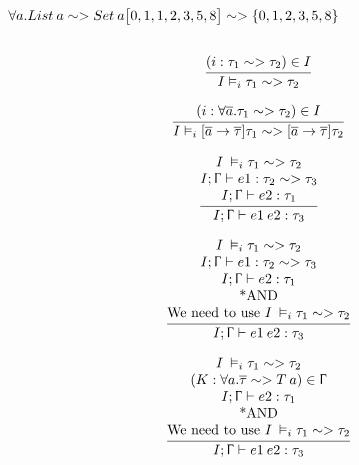 \documentclass{article}
\begin{document}
 
$\forall a. List\:a \sim > Set\:a\\ \\ \\
\big[0,1,1,2,3,5,8\big] \sim > \{0,1,2,3,5,8\}$ \\ \\

\[
  \frac{\begin{array}{@{}c@{}}
   (i: \tau_{1} \sim >\tau_{2}) \in I\\
   
  \end{array}}
  {I \vDash_{i} \tau_{1} \sim > \tau_{2}}
\]

\[
  \frac{\begin{array}{@{}c@{}}
   (i:\forall \overline{a}. \tau_{1} \sim >\tau_{2}) \in I\\
   
  \end{array}}
  {I \vDash_{i} [\overline{a}\rightarrow\overline{\tau}]\tau_{1} \sim > [\overline{a}\rightarrow\overline{\tau}]\tau_{2}}
\]

\[
  \frac{\begin{array}{@{}c@{}}
   I \: \vDash_{i} \tau_{1} \sim > \tau_{2} \\
   I; \Upgamma \vdash e1 : \tau_{2} \sim > \tau_{3}\\
   I; \Upgamma \vdash e2 : \tau_{1}
  \end{array}}
  {I; \Upgamma \vdash e1 \: e2 : \tau_{3}}
\]

\[
  \frac{\begin{array}{@{}c@{}}
   I \: \vDash_{i} \tau_{1} \sim > \tau_{2} \\
   I; \Upgamma \vdash e1 : \tau_{2} \sim > \tau_{3}\\
   I; \Upgamma \vdash e2 : \tau_{1} \\
   $*AND$\\
   $We need to use $I \: \vDash_{i} \tau_{1} \sim > \tau_{2}
  \end{array}}
  {I; \Upgamma \vdash e1 \: e2 : \tau_{3}}
\]

\[
  \frac{\begin{array}{@{}c@{}}
   I \: \vDash_{i} \tau_{1} \sim > \tau_{2} \\
   (K : \forall a. \overline{\tau} \sim > T \: a)  \in \Upgamma \\
   I; \Upgamma \vdash e2 : \tau_{1} \\
   $*AND$\\
   $We need to use $I \: \vDash_{i} \tau_{1} \sim > \tau_{2}
  \end{array}}
  {I; \Upgamma \vdash e1 \: e2 : \tau_{3}}
\]
\end{document}
